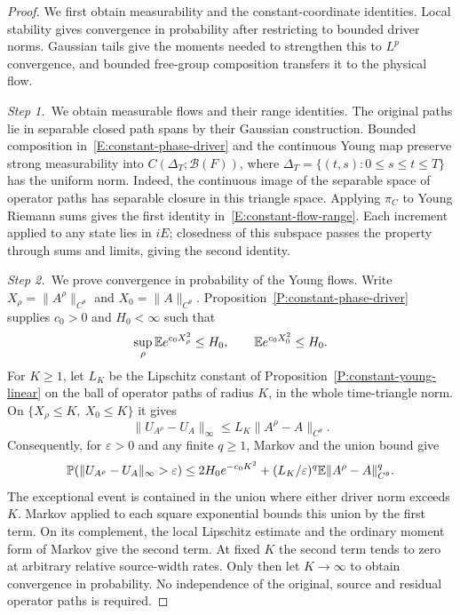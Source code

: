 \begin{proof}
  We first obtain measurability and the constant-coordinate identities. Local
  stability gives convergence in probability after restricting to bounded
  driver norms. Gaussian tails give the moments needed to strengthen this to
  $L^p$ convergence, and bounded free-group composition transfers it to the
  physical flow.

  \medskip
  \noindent\textit{Step 1.~}We obtain measurable flows and their range
  identities.
  The original paths lie in separable closed path spans by their Gaussian
  construction. Bounded composition in~\eqref{E:constant-phase-driver} and the
  continuous Young map preserve strong measurability into
  $C(\Delta_T;\mathcal{B}(F))$, where $\Delta_T = \{(t,s):0\le s\le t\le T\}$
  has the uniform norm. Indeed, the continuous image of the separable space of
  operator paths has separable closure in this triangle space. Applying $\pi_C$
  to Young Riemann sums gives the first identity
  in~\eqref{E:constant-flow-range}. Each increment applied to any state lies in
  $iE$; closedness of this subspace passes the property through sums and limits,
  giving the second identity.

  \medskip
  \noindent\textit{Step 2.~}We prove convergence in probability of the Young
  flows.
  Write $X_\rho = \|A^\rho\|_{C^\theta}$ and $X_0 = \|A\|_{C^\theta}$.
  Proposition~\ref{P:constant-phase-driver} supplies $c_0 > 0$ and $H_0 <
  \infty$ such that
  \[
    \sup_\rho\mathbb{E} e^{c_0X_\rho^2}\le H_0,\qquad
    \mathbb{E} e^{c_0X_0^2}\le H_0.
  \]
  For $K \ge 1$, let $L_K$ be the Lipschitz constant of
  Proposition~\ref{P:constant-young-linear} on the ball of operator paths of
  radius $K$, in the whole time-triangle norm. On $\{X_\rho\le K,\ X_0\le K\}$
  it gives
  \[
    \|U_{A^\rho}-U_A\|_\infty
    \le L_K\|A^\rho-A\|_{C^\theta}.
  \]
  Consequently, for $\varepsilon > 0$ and any finite $q \ge 1$, Markov and the
  union bound give
  \[
    \mathbb{P}(\|U_{A^\rho}-U_A\|_\infty>\varepsilon)
    \le2H_0e^{-c_0K^2}
    +(L_K/\varepsilon)^q\mathbb{E}\|A^\rho-A\|_{C^\theta}^q.
  \]
  The exceptional event is contained in the union where either driver norm
  exceeds $K$. Markov applied to each square exponential bounds this union by
  the first term. On its complement, the local Lipschitz estimate and the
  ordinary moment form of Markov give the second term.
  At fixed $K$ the second term tends to zero at arbitrary relative source-width
  rates. Only then let $K \to \infty$ to obtain convergence in probability. No
  independence of the original, source and residual operator paths is required.


\end{proof}
